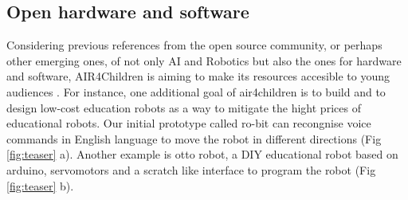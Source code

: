 \documentclass[sigconf]{acmart}
\begin{document}






\subsection{Open hardware and software}
Considering previous references from the open source community, or perhaps other emerging ones, of not only AI and Robotics but also the ones for hardware and software, AIR4Children is aiming to make its resources accesible to young audiences \cite{UNICEF2020}.
For instance, one additional goal of air4children is to build and to design low-cost education robots as a way to mitigate the hight prices of educational robots.
Our initial prototype called ro-bit can recongnise voice commands in English language to move the robot in different directions (Fig \ref{fig:teaser} a).
Another example is otto robot, a DIY educational robot based on arduino, servomotors and a scratch like interface to program the robot (Fig \ref{fig:teaser} b). 
\end{document}
